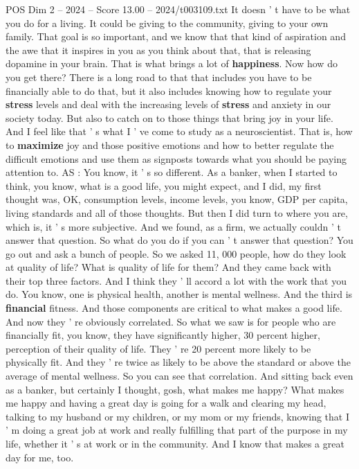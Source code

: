 \begin{textsample}{POS Dim 2 – 2024 – Score 13.00 – 2024/t003109.txt}
It doesn ' t have to be what you do for a living.
It could be giving to the community, giving to your own family.
That goal is so important, and we know that that kind of aspiration and the awe that it inspires in you as you think about that, that is releasing dopamine in your brain.
That is what brings a lot of \textbf{happiness}.
Now how do you get there?
There is a long road to that that includes you have to be financially able to do that, but it also includes knowing how to regulate your \textbf{stress} levels and deal with the increasing levels of \textbf{stress} and anxiety in our society today.
But also to catch on to those things that bring joy in your life.
And I feel like that ' s what I ' ve come to study as a neuroscientist.
That is, how to \textbf{maximize} joy and those positive emotions and how to better regulate the difficult emotions and use them as signposts towards what you should be paying attention to.
AS : You know, it ' s so different.
As a banker, when I started to think, you know, what is a good life, you might expect, and I did, my first thought was, OK, consumption levels, income levels, you know, GDP per capita, living standards and all of those thoughts.
But then I did turn to where you are, which is, it ' s more subjective.
And we found, as a firm, we actually couldn ' t answer that question.
So what do you do if you can ' t answer that question?
You go out and ask a bunch of people.
So we asked 11, 000 people, how do they look at quality of life?
What is quality of life for them?
And they came back with their top three factors.
And I think they ' ll accord a lot with the work that you do.
You know, one is physical health, another is mental wellness.
And the third is \textbf{financial} fitness.
And those components are critical to what makes a good life.
And now they ' re obviously correlated.
So what we saw is for people who are financially fit, you know, they have significantly higher, 30 percent higher, perception of their quality of life.
They ' re 20 percent more likely to be physically fit.
And they ' re twice as likely to be above the standard or above the average of mental wellness.
So you can see that correlation.
And sitting back even as a banker, but certainly I thought, gosh, what makes me happy?
What makes me happy and having a great day is going for a walk and clearing my head, talking to my husband or my children, or my mom or my friends, knowing that I ' m doing a great job at work and really fulfilling that part of the purpose in my life, whether it ' s at work or in the community.
And I know that makes a great day for me, too.

\end{textsample}
